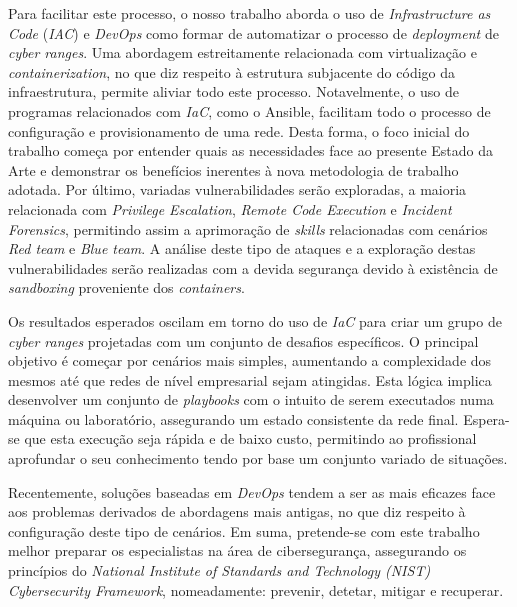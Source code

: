Para facilitar este processo, o nosso trabalho aborda o uso de \textit{Infrastructure as Code} (\textit{IAC}) e \textit{DevOps} como formar de automatizar o processo de \textit{deployment} de \textit{cyber ranges}. Uma abordagem estreitamente relacionada com virtualização e \textit{containerization}, no que diz respeito à estrutura subjacente do código da infraestrutura, permite aliviar todo este processo. Notavelmente, o uso de programas relacionados com \textit{IaC}, como o Ansible, facilitam todo o processo de configuração e provisionamento de uma rede. Desta forma, o foco inicial do trabalho começa por entender quais as necessidades face ao presente Estado da Arte e demonstrar os benefícios inerentes à nova metodologia de trabalho adotada. Por último, variadas vulnerabilidades serão exploradas, a maioria relacionada com \textit{Privilege Escalation}, \textit{Remote Code Execution} e \textit{Incident Forensics}, permitindo assim a aprimoração de \textit{skills} relacionadas com cenários \textit{Red team} e \textit{Blue team}. A análise deste tipo de ataques e a exploração destas vulnerabilidades serão realizadas com a devida segurança devido à existência de \textit{sandboxing} proveniente dos \textit{containers}.

Os resultados esperados oscilam em torno do uso de \textit{IaC} para criar um grupo de \textit{cyber ranges} projetadas com um conjunto de desafios específicos. O principal objetivo é começar por cenários mais simples, aumentando a complexidade dos mesmos até que redes de nível empresarial sejam atingidas. Esta lógica implica desenvolver um conjunto de \textit{playbooks} com o intuito de serem executados numa máquina ou laboratório, assegurando um estado consistente da rede final. Espera-se que esta execução seja rápida e de baixo custo, permitindo ao profissional aprofundar o seu conhecimento tendo por base um conjunto variado de situações.

Recentemente, soluções baseadas em \textit{DevOps} tendem a ser as mais eficazes face aos problemas derivados de abordagens mais antigas, no que diz respeito à configuração deste tipo de cenários. Em suma, pretende-se com este trabalho melhor preparar os especialistas na área de cibersegurança, assegurando os princípios do \textit{National Institute of Standards and Technology (NIST) Cybersecurity Framework}, nomeadamente: prevenir, detetar, mitigar e recuperar. \\

